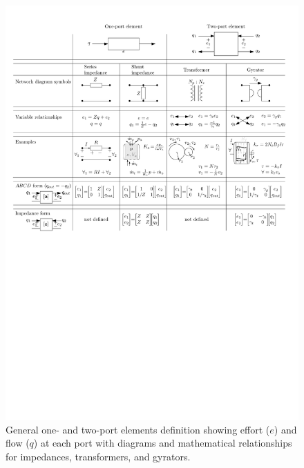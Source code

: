 \documentclass[twocolumn]{autart}
\newcommand{\rc}[1]{\textcolor{red}{#1}}
\begin{document}
\begin{figure}
	\centering
	\includegraphics[width=\textwidth]{wec_as_multiport_transformer_gyrator_impedance_Z_A.pdf}
	\caption{General one- and two-port elements definition showing effort ($e$) and flow ($q$) at each port with diagrams and mathematical relationships for impedances, transformers, and gyrators.}
	\label{fig:wec_as_multiport_transformer_gyrator}
\end{figure}
\end{document}
